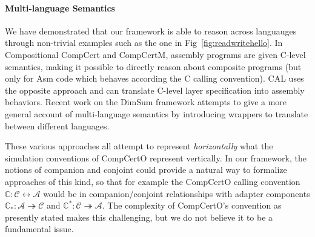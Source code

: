 \documentclass[acmsmall,screen,review,nonacm]{acmart}
\begin{document}

\paragraph{Multi-language Semantics} %

We have demonstrated that our framework is able to reason across languauges through non-trivial examples such as the one in Fig~\ref{fig:readwritehello}.
In Compositional CompCert and CompCertM,
assembly programs are given C-level semantics,
making it possible to directly reason about composite programs
(but only for Asm code which behaves according the C calling convention).
CAL uses the opposite approach and can translate
C-level layer specification into assembly behaviors.
Recent work on the DimSum framework \cite{dimsum}
attempts to give a more general account of
multi-language semantics
by introducing wrappers to translate between
different languages.

These various approaches all attempt
to represent \emph{horizontally} what
the simulation conventions of CompCertO represent vertically.
In our framework,
the notions of companion and conjoint
could provide a natural way to formalize
approaches of this kind,
so that for example the CompCertO calling convention
$\mathbb{C} : \mathcal{C} \leftrightarrow \mathcal{A}$
would be in companion/conjoint relationships with
adapter components
$\mathbb{C}_* : \mathcal{A} \twoheadrightarrow \mathcal{C}$
and
$\mathbb{C}^* : \mathcal{C} \twoheadrightarrow \mathcal{A}$.
The complexity of CompCertO's convention as presently stated
makes this challenging,
but we do not believe it to be a fundamental issue.
\end{document}
